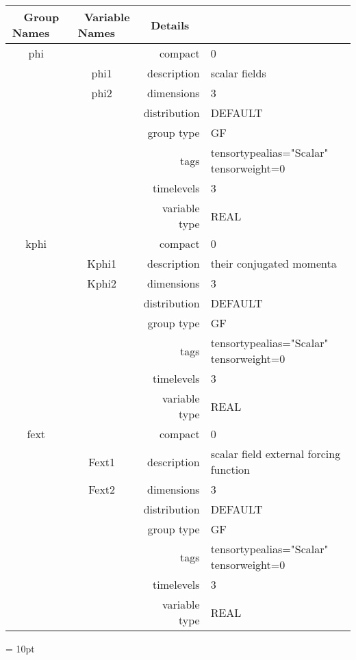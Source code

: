 \begin{tabular*}{150mm}{|c|c@{\extracolsep{\fill}}|rl|} \hline 
~ {\bf Group Names} ~ & ~ {\bf Variable Names} ~  &{\bf Details} ~ & ~\\ 
\hline 
phi &  & compact & 0 \\ 
 & phi1 & description & scalar fields \\ 
 & phi2 & dimensions & 3 \\ 
 &  & distribution & DEFAULT \\ 
 &  & group type & GF \\ 
 &  & tags & tensortypealias="Scalar" tensorweight=0 \\ 
 &  & timelevels & 3 \\ 
 &  & variable type & REAL \\ 
\hline 
kphi &  & compact & 0 \\ 
 & Kphi1 & description & their conjugated momenta \\ 
 & Kphi2 & dimensions & 3 \\ 
 &  & distribution & DEFAULT \\ 
 &  & group type & GF \\ 
 &  & tags & tensortypealias="Scalar" tensorweight=0 \\ 
 &  & timelevels & 3 \\ 
 &  & variable type & REAL \\ 
\hline 
fext &  & compact & 0 \\ 
 & Fext1 & description & scalar field external forcing function \\ 
 & Fext2 & dimensions & 3 \\ 
 &  & distribution & DEFAULT \\ 
 &  & group type & GF \\ 
 &  & tags & tensortypealias="Scalar" tensorweight=0 \\ 
 &  & timelevels & 3 \\ 
 &  & variable type & REAL \\ 
\hline 
\end{tabular*} 



\vspace{5mm}\parskip = 10pt 
